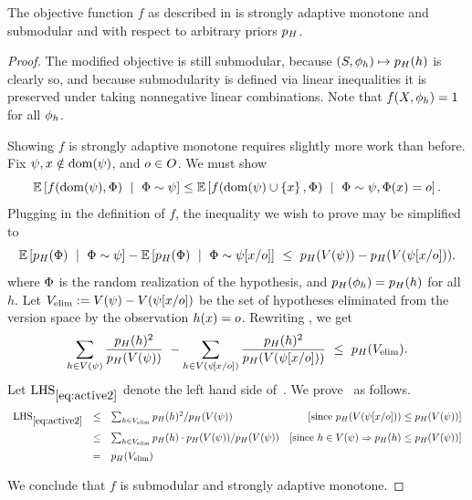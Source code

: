 \begin{lemma} \label{lem:active-learning-adapt-submod-arbitrary-priors}
The objective function $f$ as described in 
is strongly adaptive monotone and \term submodular and with respect to arbitrary priors $p_{H}$.
\end{lemma}

\begin{proof}
The modified objective is still \term submodular, because 
$(S, {\color{black}{\ensuremath{\phi}}}_h) \mapsto p_{H}(h)$ is clearly so, and because \term submodularity is defined
via linear inequalities it is preserved under taking nonnegative linear combinations. 
Note that $f(X, {\color{black}{\ensuremath{\phi}}}_h) = 1$ for all ${\color{black}{\ensuremath{\phi}}}_h$.


Showing $f$ is strongly adaptive monotone requires slightly more
work than before.  
Fix ${\color{black}{\ensuremath{\psi}}}, x \notin \operatorname{dom}({\color{black}{\ensuremath{\psi}}})$, and
$o \in O$.  We must show 
\begin{equation}
  \label{eq:active-learning2}
  \expctoverrlz{\rvrlz}{f(\dom(\prlz), \rvrlz) \ \mid \ \rvrlz \sim \prlz} \le 
\expctoverrlz{\rvrlz}{f(\dom(\prlz) \cup \set{x}, \rvrlz) \ \mid \ \rvrlz \sim
  \prlz, \rvrlz(x) = \outcome}.  
\end{equation}
Plugging in
the definition of $f$, the
inequality we wish to prove may be simplified to 
\begin{equation}
  \label{eq:active1}
  \expctoverrlz{\rvrlz}{\prior(\rvrlz) \ \mid \ \rvrlz \sim \prlz} -
\expctoverrlz{\rvrlz}{\prior(\rvrlz) \ \mid \ \rvrlz \sim \prlzxo} \ 
\le \ \prior(\vs(\prlz)) - \prior(\vs(\prlzxo))\mbox{.}
\end{equation}
where ${\color{black}{\ensuremath{\Phi}}}$ is the random realization of the hypothesis, and 
$p_{H}({\color{black}{\ensuremath{\phi}}}_h) = p_{H}(h)$ for all $h$. 
Let $V_{\text{elim}} := V({\color{black}{\ensuremath{\psi}}}) - V({{\color{black}{\ensuremath{\psi}}}}\!\left[{x}/{o}\right])$ be the set of hypotheses
eliminated from the version space by the observation $h(x) = o$.
Rewriting \eqnref{eq:active1}, we get 
\begin{equation}
  \label{eq:active2}
\sum_{h \in \vs(\prlz)} \frac{\prior(h)^2}{\prior(\vs(\prlz))} \ 
- \sum_{h \in \vs(\prlzxo)}
  \frac{\prior(h)^2}{\prior(\vs(\prlzxo))} \ \le \ \prior(\vselim)
\mbox{.}
\end{equation}
Let $\operatorname{LHS}_{\ref{eq:active2}}$ denote the left hand side
of~.  We prove~  as follows.
\[
\begin{array}{lclr}
\operatorname{LHS}_{\ref{eq:active2}} 
& \le &  \sum_{h \in
    \vselim} \prior(h)^2 / \prior(\vs(\prlz)) &
  [\text{since }\prior(\vs(\prlzxo)) \le \prior(\vs(\prlz)) ]\vspace{2mm}\\
 & \le & \sum_{h \in
    \vselim} \prior(h) \cdot
    \prior(\vs(\prlz)) / \prior(\vs(\prlz)) & \hspace{0mm} [\text{since } h \in
  \vs(\prlz) \implies \prior(h)
  \le \prior(\vs(\prlz))  ]\vspace{2mm}\\
 & = &  \prior(\vselim) & \\
\end{array}
\]

\noindent We conclude that $f$ is \term submodular and strongly
adaptive monotone.
\end{proof}


